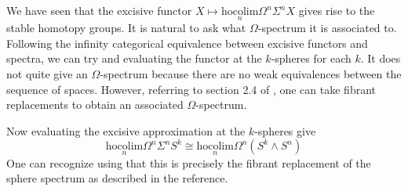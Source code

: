 \begin{eg}\label{SphereSpec} We have seen that the excisive functor $X\mapsto\underset{n}{\text{hocolim}}\Omega^n\Sigma^nX$ gives rise to the stable homotopy groups. It is natural to ask what $\Omega$-spectrum it is associated to. Following the infinity categorical equivalence between excisive functors and spectra, we can try and evaluating the functor at the $k$-spheres for each $k$. It does not quite give an $\Omega$-spectrum because there are no weak equivalences between the sequence of spaces. However, referring to section 2.4 of \cite{FSHT}, one can take fibrant replacements to obtain an associated $\Omega$-spectrum. 

Now evaluating the excisive approximation at the $k$-spheres give $$\underset{n}{\text{hocolim}}\Omega^n\Sigma^nS^k\cong\underset{n}{\text{hocolim}}\Omega^n(S^k\wedge S^n)$$ One can recognize using \cite{FSHT} that this is precisely the fibrant replacement of the sphere spectrum as described in the reference. 
\end{eg}
